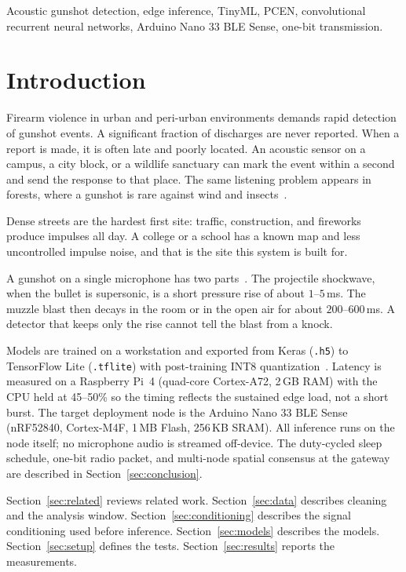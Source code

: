\documentclass[conference]{IEEEtran}
\begin{document}
\begin{IEEEkeywords}
Acoustic gunshot detection, edge inference, TinyML, PCEN, convolutional recurrent neural networks, Arduino Nano 33 BLE Sense, one-bit transmission.
\end{IEEEkeywords}

\section{Introduction}
\label{sec:intro}

Firearm violence in urban and peri-urban environments demands rapid detection of gunshot events. A significant fraction of discharges are never reported. When a report is made, it is often late and poorly located. An acoustic sensor on a campus, a city block, or a wildlife sanctuary can mark the event within a second and send the response to that place. The same listening problem appears in forests, where a gunshot is rare against wind and insects~\cite{saha2025}.

Dense streets are the hardest first site: traffic, construction, and fireworks produce impulses all day. A college or a school has a known map and less uncontrolled impulse noise, and that is the site this system is built for.

A gunshot on a single microphone has two parts~\cite{maher2007}. The projectile shockwave, when the bullet is supersonic, is a short pressure rise of about $1$--$5$\,ms. The muzzle blast then decays in the room or in the open air for about $200$--$600$\,ms. A detector that keeps only the rise cannot tell the blast from a knock.

Models are trained on a workstation and exported from Keras (\texttt{.h5}) to TensorFlow Lite (\texttt{.tflite}) with post-training INT8 quantization~\cite{david2021}. Latency is measured on a Raspberry Pi~4 (quad-core Cortex-A72, 2\,GB RAM) with the CPU held at 45--50\% so the timing reflects the sustained edge load, not a short burst. The target deployment node is the Arduino Nano 33 BLE Sense (nRF52840, Cortex-M4F, 1\,MB Flash, 256\,KB SRAM). All inference runs on the node itself; no microphone audio is streamed off-device. The duty-cycled sleep schedule, one-bit radio packet, and multi-node spatial consensus at the gateway are described in Section~\ref{sec:conclusion}.

Section~\ref{sec:related} reviews related work. Section~\ref{sec:data} describes cleaning and the analysis window. Section~\ref{sec:conditioning} describes the signal conditioning used before inference. Section~\ref{sec:models} describes the models. Section~\ref{sec:setup} defines the tests. Section~\ref{sec:results} reports the measurements.
\end{document}

